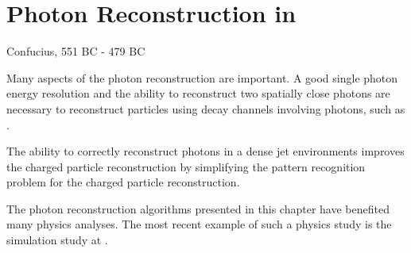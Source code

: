 \chapter{Photon Reconstruction in \pandora}
\label{chap:Photon}

%
{Confucius, 551 BC - 479 BC}

Many aspects of the photon reconstruction are important. A good single photon energy resolution and the ability to reconstruct two spatially close photons are necessary to reconstruct particles using decay channels involving photons, such as \HepProcess{\Ppizero\to\Pgamma\Pgamma}.



The ability to correctly reconstruct photons in a dense jet environments improves the charged particle reconstruction by simplifying the  pattern recognition problem for the charged particle reconstruction.


The photon reconstruction algorithms presented in this chapter have benefited many physics analyses. The most recent example of such a physics study is the  \HepProcess{\PHiggs \to \Pgamma \Pgamma} simulation study at  \CLIC \cite{Kacarevic:higgsToGammaGamma}.

